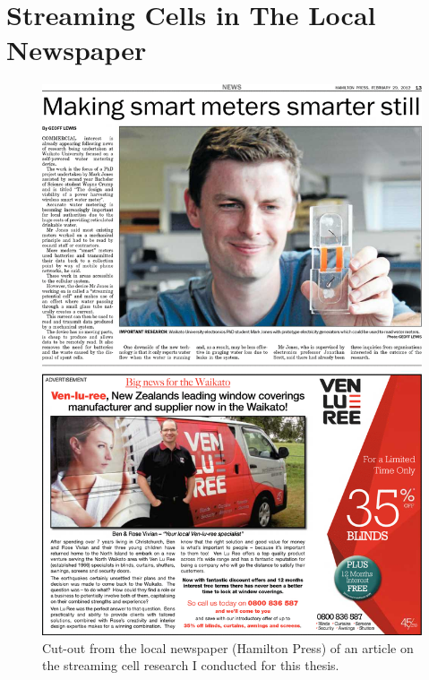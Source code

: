    \chapter{Streaming Cells in The Local Newspaper}
   \begin{figure}
       \centering
       \includegraphics[width=\textwidth]{content/appendices/Article}
       \caption{Cut-out from the local newspaper (Hamilton Press) of an article on the streaming cell research I conducted for this thesis.}
   \end{figure}






